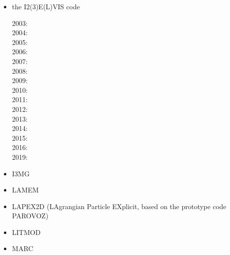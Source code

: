 \begin{itemize}
\item the I2(3)E(L)VIS code

2003: \cite{geyu03}\cite{geyu03b}\cite{geur03}\\
2004: \cite{geym04}\cite{geys04}\cite{gepm04}\\
2005: \cite{buge05}\\
2006: \cite{bbeg06}\cite{gest06}\cite{gogc06}\cite{gecy06}\\
2007: \cite{geyu07}\cite{gogc07}\\
2008: \cite{scbe08}\cite{gecy08}\cite{uegs08}\cite{fagc08}\cite{zhgy09}\\
2009: \cite{gefc09}\\
2010: \cite{gerya2010}\cite{nigm10}\\
2011: \cite{dugm11}\cite{dumg11}\cite{lixg11}\cite{gery11}\cite{geme11}\\
2012: \cite{crsg12}\cite{dugk12}\cite{lixg12}\cite{fagm12}\\
2013: \cite{lixg13}\cite{nabg13}\cite{magc13}\cite{vagd13a}\cite{vagd13b}\cite{zhgt13}\cite{dyge13}\cite{gemd13}\cite{mana13}\\
2014: \cite{dugs14}\cite{puge14}\cite{rugb14}\cite{voge14b}\cite{bagb14}\cite{lige14}\cite{stjm14}\cite{malg14}
\cite{buge14}\cite{gosk14}\cite{bagb14}\cite{vamd14}\\
2015: \cite{duay15}\cite{uewg15}\cite{rula15}\cite{gesb15}\cite{rula15}\\
2016: \cite{kobc16}\cite{magc16}\cite{fige16}\\
2019: \cite{kobg19}\cite{ligc19}

\item I3MG
\cite{facc14}

\item LAMEM
\cite{scbe08}
\cite{kamm10}
\cite{lemk11}
\cite{may12}
\cite{lesh14}
\cite{cokm14}
\cite{bakp14}
\cite{feka14a}
\cite{feka14b}
\cite{puka15}
\cite{feka15}
\cite{cofk15}
\cite{kapb16}

\item LAPEX2D (LAgrangian Particle EXplicit, based on the prototype code PAROVOZ) 
\cite{sopg05}
\cite{bbeg06}\cite{basv06}
\cite{baso08}
\cite{scbe08}
\cite{sosk11}


\item LITMOD
\cite{afrf07}
\cite{affr08}
\cite{fuac09}
\cite{fufa10}


\item MARC
\cite{nesg97}
\cite{nesb99}



\end{itemize}
